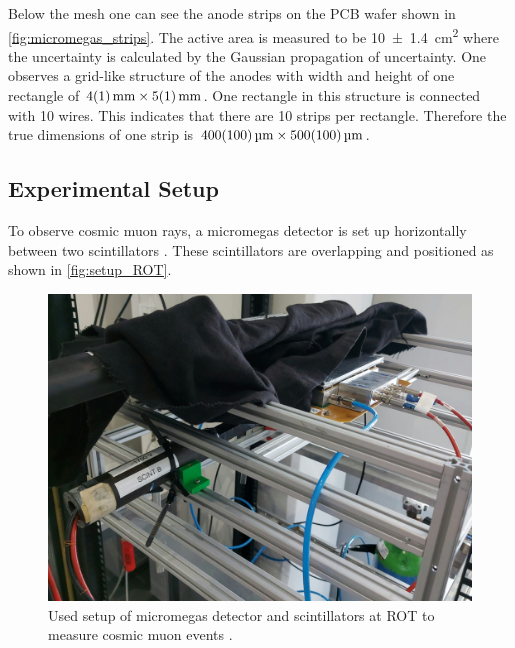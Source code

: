 \documentclass[sn-mathphys-num,iicol]{sn-jnl}
\theoremstyle{thmstyleone}
\theoremstyle{thmstyletwo}
\theoremstyle{thmstylethree}
\begin{document}
Below the mesh one can see the anode strips on the PCB wafer shown in \autoref{fig:micromegas_strips}.
The active area is measured to be \SI{10\pm1.4}{\cm^2} where the uncertainty is calculated by the Gaussian propagation of uncertainty.
One observes a grid-like structure of the anodes with width and height of one rectangle of $\SI{4\pm1}{\mm}\times\SI{5\pm1}{\mm}$.
One rectangle in this structure is connected with 10 wires.
This indicates that there are 10 strips per rectangle.
Therefore the true dimensions of one strip is $\SI{400\pm100}{\micro\meter}\times\SI{500\pm100}{\micro\meter}$.


\subsection{Experimental Setup}
To observe cosmic muon rays, a micromegas detector is set up horizontally between two scintillators \cite{Scint}.
These scintillators are overlapping and positioned as shown in \autoref{fig:setup_ROT}.

\begin{figure}
  \includegraphics[width=\linewidth]{figures/setup_ROT.jpeg}
  \caption{Used setup of micromegas detector and scintillators at ROT to measure cosmic muon events \cite{Micromega}.}
  \label{fig:setup_ROT}
\end{figure}
\end{document}
